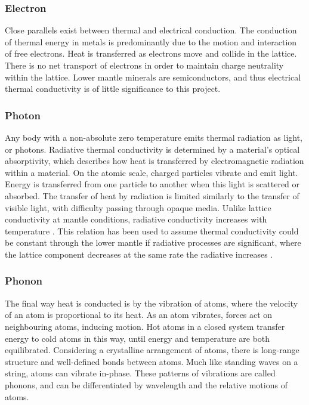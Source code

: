 \subsubsection{Electron}

Close parallels exist between thermal and electrical conduction. The conduction of thermal energy in metals is predominantly due to the motion and interaction of free electrons. Heat is transferred as electrons move and collide in the lattice. There is no net transport of electrons in order to maintain charge neutrality within the lattice. Lower mantle minerals are semiconductors, and thus electrical thermal conductivity is of little significance to this project.

\subsubsection{Photon}

Any body with a non-absolute zero temperature emits thermal radiation as light, or photons. Radiative thermal conductivity is determined by a material's optical absorptivity, which describes how heat is transferred by electromagnetic radiation within a material. On the atomic scale, charged particles vibrate and emit light. Energy is transferred from one particle to another when this light is scattered or absorbed. The transfer of heat by radiation is limited similarly to the transfer of visible light, with difficulty passing through opaque media. Unlike lattice conductivity at mantle conditions, radiative conductivity increases with temperature \citep{Hofmeister1999}. This relation has been used to assume thermal conductivity could be constant through the lower mantle if radiative processes are significant, where the lattice component decreases at the same rate the radiative increases \citep{Tang2014}.

\subsubsection{Phonon}
\label{sec.phonon_explan}

The final way heat is conducted is by the vibration of atoms, where the velocity of an atom is proportional to its heat. As an atom vibrates, forces act on neighbouring atoms, inducing motion. Hot atoms in a closed system transfer energy to cold atoms in this way, until energy and temperature are both equilibrated. Considering a crystalline arrangement of atoms, there is long-range structure and well-defined bonds between atoms. Much like standing waves on a string, atoms can vibrate in-phase. These patterns of vibrations are called phonons, and can be differentiated by wavelength and the relative motions of atoms.

